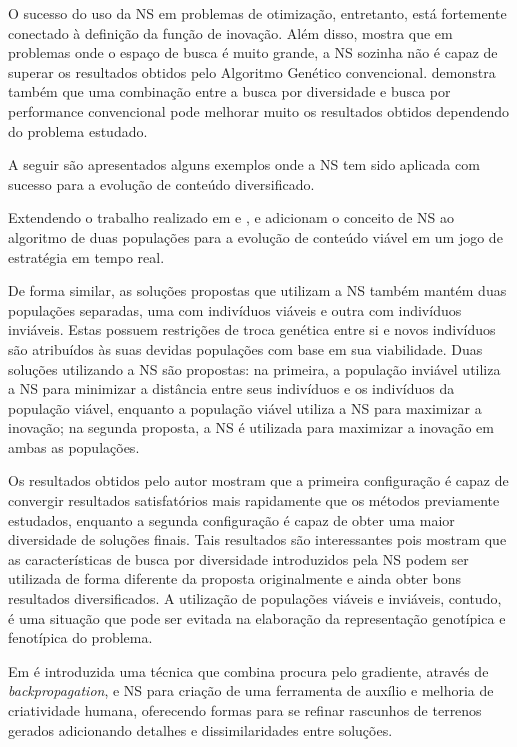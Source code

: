 O sucesso do uso da NS em problemas de otimização, entretanto, está fortemente conectado à definição da função de inovação. Além disso,  \cite{cuccu2011novelty} mostra que em problemas onde o espaço de busca é muito grande, a NS sozinha não é capaz de superar os resultados obtidos pelo Algoritmo Genético convencional. \cite{cuccu2011novelty} demonstra também que uma combinação entre a busca por diversidade e busca por performance convencional pode melhorar muito os resultados obtidos dependendo do problema estudado.

A seguir são apresentados alguns exemplos onde a NS tem sido aplicada com sucesso para a evolução de conteúdo diversificado.

Extendendo o trabalho realizado em \cite{liapis2013generating} e \cite{liapis2013adaptive}, \cite{liapis2015constrained} e \cite{liapis2013enhancements} adicionam o conceito de NS ao algoritmo de duas populações para a evolução de conteúdo viável em um jogo de estratégia em tempo real.

De forma similar, as soluções propostas que utilizam a NS também mantém duas populações separadas, uma com indivíduos viáveis e outra com indivíduos inviáveis. Estas possuem restrições de troca genética entre si e novos indivíduos são atribuídos às suas devidas populações com base em sua viabilidade. Duas soluções utilizando a NS são propostas: na primeira, a população inviável utiliza a NS para minimizar a distância entre seus indivíduos e os indivíduos da população viável, enquanto a população viável utiliza a NS para maximizar a inovação; na segunda proposta, a NS é utilizada para maximizar a inovação em ambas as populações.

Os resultados obtidos pelo autor mostram que a primeira configuração é capaz de convergir resultados satisfatórios mais rapidamente que os métodos previamente estudados, enquanto a segunda configuração é capaz de obter uma maior diversidade de soluções finais. Tais resultados são interessantes pois mostram que as características de busca por diversidade introduzidos pela NS podem ser utilizada de forma diferente da proposta originalmente e ainda obter bons resultados diversificados. A utilização de populações viáveis e inviáveis, contudo, é uma situação que pode ser evitada na elaboração da representação genotípica e fenotípica do problema.

Em \cite{liapis2013sentient} é introduzida uma técnica que combina procura pelo gradiente, através de \emph{backpropagation}, e NS para criação de uma ferramenta de auxílio e melhoria de criatividade humana, oferecendo formas para se refinar rascunhos de terrenos gerados adicionando detalhes e dissimilaridades entre soluções.

